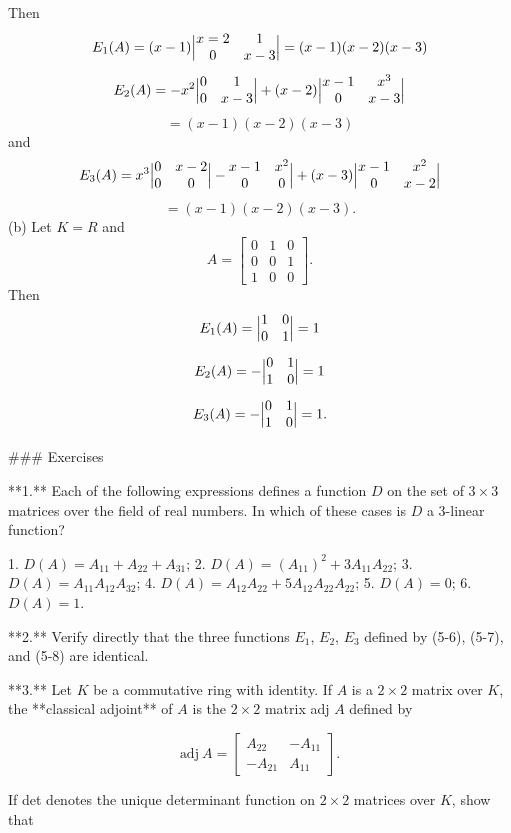 Then \[E_{1}(A) = (x-1)\Big{|}\begin{matrix}x=2&1\\ 0&x-3\end{matrix}\Big{|}=(x-1)(x-2)(x-3)\] \[E_{2}(A) = -x^{2}\Big{|}\begin{matrix}0&1\\ 0&x-3\end{matrix}\Big{|}+(x-2)\Big{|}\begin{matrix}x-1&x^{3}\\ 0&x-3\end{matrix}\Big{|}\] \[= (x-1)(x-2)(x-3)\] and \[E_{3}(A) = x^{3}\Big{|}\begin{matrix}0&x-2\\ 0&0\end{matrix}\Big{|}-\begin{matrix}x-1&x^{2}\\ 0&0\end{matrix}\Big{|}+(x-3)\Big{|}\begin{matrix}x-1&x^{2}\\ 0&x-2\end{matrix}\Big{|}\] \[= (x-1)(x-2)(x-3).\] (b) Let \(K=R\) and \[A=\begin{bmatrix}0&1&0\\ 0&0&1\\ 1&0&0\end{bmatrix}.\] Then \[E_{1}(A) = \Big{|}\begin{matrix}1&0\\ 0&1\end{matrix}\Big{|}=1\] \[E_{2}(A) = -\Big{|}\begin{matrix}0&1\\ 1&0\end{matrix}\Big{|}=1\] \[E_{3}(A) = -\Big{|}\begin{matrix}0&1\\ 1&0\end{matrix}\Big{|}=1.\]

### Exercises

**1.** Each of the following expressions defines a function \(D\) on the set of \(3\times 3\) matrices over the field of real numbers. In which of these cases is \(D\) a 3-linear function?

1. \(D(A)=A_{11}+A_{22}+A_{31}\);
2. \(D(A)=(A_{11})^{2}+3A_{11}A_{22}\);
3. \(D(A)=A_{11}A_{12}A_{32}\);
4. \(D(A)=A_{12}A_{22}+5A_{12}A_{22}A_{22}\);
5. \(D(A)=0\);
6. \(D(A)=1\).

**2.** Verify directly that the three functions \(E_{1}\), \(E_{2}\), \(E_{3}\) defined by (5-6), (5-7), and (5-8) are identical.

**3.** Let \(K\) be a commutative ring with identity. If \(A\) is a \(2\times 2\) matrix over \(K\), the **classical adjoint** of \(A\) is the \(2\times 2\) matrix adj \(A\) defined by

\[\text{adj}\ A=\begin{bmatrix}A_{22}&-A_{11}\\ -A_{21}&A_{11}\end{bmatrix}.\]

If det denotes the unique determinant function on \(2\times 2\) matrices over \(K\), show that 